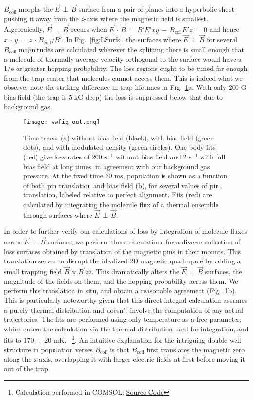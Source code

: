 \documentclass[%
 reprint,
 amsmath,amssymb,
 aps,
prl,
]{revtex4-1}
\newcommand{\bcl}{{$B_\text{coil}$}}
\newcommand{\epb}{{$\vec{E}\,{\perp}\,\vec{B}$}}
\begin{document}
\bcl{} morphs the \epb{} surface from a pair of planes into a hyperbolic sheet, pushing it away from the $z$-axis where the magnetic field is smallest. 
Algebraically, \epb{} occurs when $\vec{E}\,{\cdot}\,\vec{B}\,{=}\,B'E'xy\,{-}\,B_\text{coil}E'z\,{=}\,0$ and hence $x\,{\cdot}\,y\,{=}\, z\,{\cdot}\,B_\text{coil}/B'$.
In Fig.~\ref{fig:LSurfs}, the surfaces where \epb{} for several \bcl{} magnitudes are calculated wherever the splitting there is small enough that a molecule of thermally average velocity orthogonal to the surface would have a 1/e or greater hopping probability.
The loss regions ought to be tuned far enough from the trap center that molecules cannot access them.
This is indeed what we observe, note the striking difference in trap lifetimes in Fig.~\ref{fig:WVplot}a.
With only $200\text{ G}$ bias field (the trap is $5\text{ kG}$ deep) the loss is suppressed below that due to background gas.

\begin{figure}[tb]
\texttt{[image: vwfig\_out.png]}%
\caption{
Time traces (a) without bias field (black), with bias field (green dots), and with modulated density (green circles). 
One body fits (red) give loss rates of $200\text{ s}^{-1}$ without bias field and $2\text{ s}^{-1}$ with full bias field at long times, in agreement with our background gas pressure. 
At the fixed time $30\text{ ms}$, population is shown as a function of both pin translation and bias field (b), for several values of pin translation, labeled relative to perfect alignment. 
Fits (red) are calculated by integrating the molecule flux of a thermal ensemble through surfaces where \epb.
\label{fig:WVplot}}
\end{figure}

In order to further verify our calculations of loss by integration of molecule fluxes across \epb{} surfaces, we perform these calculations for a diverse collection of loss surfaces obtained by translation of the magnetic pins in their mounts. 
This translation serves to disrupt the idealized 2D magnetic quadrupole by adding a small trapping field $\vec{B}\propto B^\prime z\hat{z}$. 
This dramatically alters the \epb{} surfaces, the magnitude of the fields on them, and the hopping probability across them.
We perform this translation in situ, and obtain a reasonable agreement (Fig.~\ref{fig:WVplot}b). 
This is particularly noteworthy given that this direct integral calculation assumes a purely thermal distribution and doesn't involve the computation of any actual trajectories.
The fits are performed using only temperature as a free parameter, which enters the calculation via the thermal distribution used for integration, and fits to $170\,{\pm}\,20\text{ mK}$.
~\footnote{Calculation performed in COMSOL: \href{https://github.com/dreens/spin-flip-integration/}{Source Code}}.
An intuitive explanation for the intriguing double well structure in population verses \bcl{} is that \bcl{} first translates the magnetic zero along the z-axis, overlapping it with larger electric fields at first before moving it out of the trap.
\end{document}
